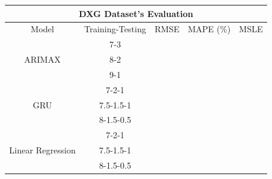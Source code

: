 \documentclass{ieeeojies}
\begin{document}
\begin{table}[H]
  \begin{tabular}{|ccccc|}
  \hline
  \multicolumn{5}{|c|}{\textbf{DXG Dataset's Evaluation}}                                                                                                                  \\ \hline
  \multicolumn{1}{|c|}{Model}                              & \multicolumn{1}{c|}{Training-Testing} & \multicolumn{1}{c|}{RMSE}    & \multicolumn{1}{c|}{MAPE (\%)} & MSLE  \\ \hline
  \multicolumn{1}{|c|}{\multirow{3}{*}{ARIMAX}}             & \multicolumn{1}{c|}{7-3}            & \multicolumn{1}{c|}{}        & \multicolumn{1}{c|}{}          &       \\ \cline{2-5} 
  \multicolumn{1}{|c|}{}                                   & \multicolumn{1}{c|}{8-2}        & \multicolumn{1}{c|}{}        & \multicolumn{1}{c|}{}          &       \\ \cline{2-5} 
  \multicolumn{1}{|c|}{}                                   & \multicolumn{1}{c|}{9-1}        & \multicolumn{1}{c|}{}        & \multicolumn{1}{c|}{}          &       \\ \hline
  \multicolumn{1}{|c|}{\multirow{3}{*}{GRU}}               & \multicolumn{1}{c|}{7-2-1}            & \multicolumn{1}{c|}{}        & \multicolumn{1}{c|}{}          &       \\ \cline{2-5} 
  \multicolumn{1}{|c|}{}                                   & \multicolumn{1}{c|}{7.5-1.5-1}        & \multicolumn{1}{c|}{}        & \multicolumn{1}{c|}{}          &       \\ \cline{2-5} 
  \multicolumn{1}{|c|}{}                                   & \multicolumn{1}{c|}{8-1.5-0.5}        & \multicolumn{1}{c|}{}        & \multicolumn{1}{c|}{}          &       \\ \hline
  \multicolumn{1}{|c|}{\multirow{3}{*}{Linear Regression}} & \multicolumn{1}{c|}{7-2-1}            & \multicolumn{1}{c|}{}        & \multicolumn{1}{c|}{}          &       \\ \cline{2-5} 
  \multicolumn{1}{|c|}{}                                   & \multicolumn{1}{c|}{7.5-1.5-1}        & \multicolumn{1}{c|}{}        & \multicolumn{1}{c|}{}          &       \\ \cline{2-5} 
  \multicolumn{1}{|c|}{}                                   & \multicolumn{1}{c|}{8-1.5-0.5}        & \multicolumn{1}{c|}{}        & \multicolumn{1}{c|}{}          &       \\ \hline

\end{tabular}
\end{table}
\end{document}
